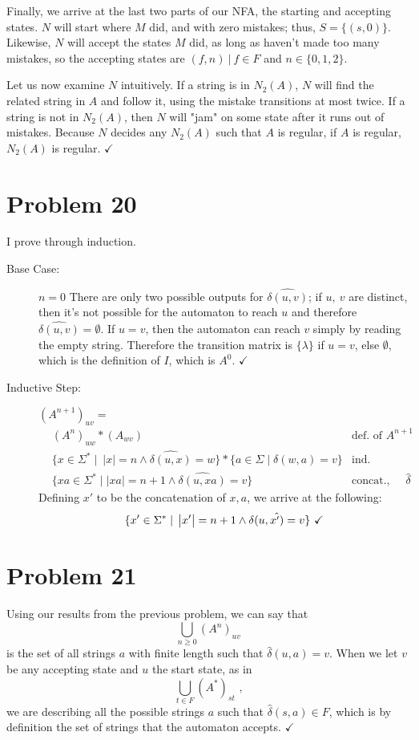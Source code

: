 \documentclass[11pt]{article}
\begin{document}
Finally, we arrive at the last two parts of our NFA, the starting and accepting states. $N$ will start where $M$ did, and with zero mistakes; thus, $S = \{ (s, 0) \}$. Likewise, $N$ will accept the states $M$ did, as long as haven't made too many mistakes, so the accepting states are $(f, n )\ |\ f \in F $ and $ n \in \{0, 1, 2\}$.

Let us now examine $N$ intuitively. If a string is in $N_2(A)$, $N$ will find the related string in $A$ and follow it, using the mistake transitions at most twice. If a string is not in $N_2(A)$, then $N$ will "jam" on some state after it runs out of mistakes. Because $N$ decides any $N_2(A)$ such that $A$ is regular, if $A$ is regular, $N_2(A)$ is regular. $\checkmark$

\section*{Problem 20}
I prove through induction.
\begin{description}
	\item [Base Case:] $n = 0$
	There are only two possible outputs for $\hat{\delta(u, v)}$; if $u,\ v$ are distinct, then it's not possible for the automaton to reach $u$ and therefore $\hat{\delta(u,v)}= \emptyset$. If $u = v$, then the automaton can reach $v$ simply by reading the empty string. Therefore the transition matrix is $\{\lambda \}$ if $u =v$, else $\emptyset$, which is the definition of $I$, which is $A^0$. $\checkmark$
	
	\item [Inductive Step:] $(A^{n+1})_{uv} =$
	\begin{align*}
		&(A^n)_{uw} * (A_{wv}) &\text{def. of $A^{n+1}$} \\
		&\{x \in \Sigma^* \mid\ |x| = n \wedge \hat{\delta(u,x)} = w\} * \{a \in \Sigma \mid \delta(w, a) = v\} &\text{ind. hypothesis}\\
		&\{ xa \in \Sigma^* \mid |xa| = n+1 \wedge \hat{\delta(u, xa)} = v \} &\text {concat., def of $\hat{\delta}$}
	\end{align*}
	Defining $x'$ to be the concatenation of $x, a$, we arrive at the following:
	\[\{x' \in \Sigma^* \mid\ \abs{x'}= n +1 \wedge \hat{\delta(u, x') = v} \}\ \checkmark \]
	

\end{description}




\section*{Problem 21}
Using our results from the previous problem, we can say that
	\[ \bigcup _{n \geq 0} (A^n)_{uv} \]
is the set of all strings $a$ with finite length such that $\hat{\delta}(u, a) = v $. When we let $v$ be any accepting state and $u$ the start state, as in 
	\[ \bigcup _{t \in F} (A^*)_{st} \text{ ,} \]
we are describing all the possible strings $a$ such that $\hat{ \delta }(s, a) \in F$, which is by definition the set of strings that the automaton accepts. $\checkmark$
\end{document}
